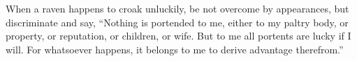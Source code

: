 When a raven happens to croak unluckily, be not overcome by appearances,
but discriminate and say, ``Nothing is portended to me, either to my
paltry body, or property, or reputation, or children, or wife. But to
me all portents are lucky if I will. For whatsoever happens, it belongs
to me to derive advantage therefrom.''

